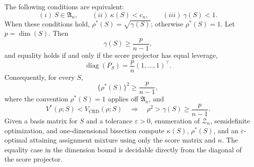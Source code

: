The following conditions are equivalent:
\[
(i)\ S\in\mathfrak A_n,
\qquad
(ii)\ \kappa(S)<c_n,
\qquad
(iii)\ \gamma(S)<1.
\]
When these conditions hold, \(\rho^*(S)=\sqrt{\gamma(S)}\); otherwise \(\rho^*(S)=1\). Let \(p=\dim(S)\). Then
\[
\gamma(S)\geq \frac{p}{n-1},
\]
and equality holds if and only if the score projector has equal leverage,
\[
\operatorname{diag}(P_S)=\frac{p}{n}(1,\ldots,1)^\top.
\]
Consequently, for every \(S\),
\[
\{\rho^*(S)\}^2\geq\frac{p}{n-1},
\]
where the convention \(\rho^*(S)=1\) applies off \(\mathfrak A_n\), and
\[
V^*(\rho;S)<V_{\mathrm{CRD}}(\rho;S)
\quad\Longrightarrow\quad
\rho^2>\gamma(S)\geq\frac{p}{n-1}.
\]
Given a basis matrix for \(S\) and a tolerance \(\varepsilon>0\), enumeration of \(\mathcal Z_n\), semidefinite optimization, and one-dimensional bisection compute \(\kappa(S)\), \(\rho^*(S)\), and an \(\varepsilon\)-optimal attaining assignment mixture using only the score matrix and \(n\). The equality case in the dimension bound is decidable directly from the diagonal of the score projector.